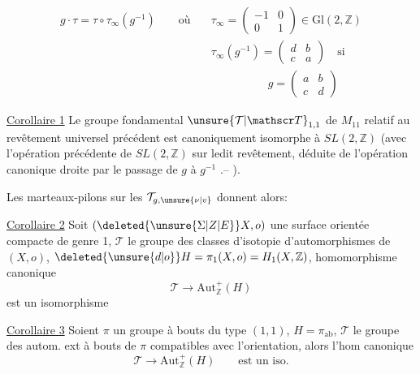 \[
\begin{aligned}
g\cdot\tau=\tau\circ\tau_\infty(g^{-1})\qquad \text{où}\quad
&\tau_\infty=\begin{pmatrix}-1&0\\0&1\end{pmatrix}\in\mathrm{Gl}(2,\mathbb Z)\\
&\tau_\infty(g^{-1})=\begin{pmatrix}d&b\\c&a\end{pmatrix}\quad \text{si}\\
&\hspace{5em}g=\begin{pmatrix}a&b\\c&d\end{pmatrix}
\end{aligned}
\]

\uline{Corollaire 1} Le groupe fondamental $\unsure{\mathcal T|\mathscr T}_{1,1}$ de $M_{11}$ relatif au revêtement universel précédent est canoniquement isomorphe à $SL(2,\mathbb Z)$ (avec l'opération précédente  de $SL(2,\mathbb Z)$ sur ledit revêtement, déduite de l'opération canonique  droite par le passage de $g$ à $g^{-1}$ .-- ).

Les marteaux-pilons sur les $\mathcal T_{g,\unsure{\nu|v}}$ donnent alors:

\uline{Corollaire 2} Soit $(\deleted{\unsure{\Sigma|Z|E}}X,o)$ une surface orientée compacte de genre 1, $\mathcal T$ le groupe des classes d'isotopie d'automorphismes de $(X,o)$, $\deleted{\unsure{d|o}}H=\pi_1(X,o)=H_1(X,\mathbb Z)$,   homomorphisme canonique
\[
\mathcal T\longrightarrow\mathrm{Aut}^{+}_{\mathbb Z}(H)\tag*{(16)}
\]
est un isomorphisme

\uline{Corollaire 3} Soient $\pi$ un groupe à bouts du type $(1,1)$, $H=\pi_{\mathrm{ab}}$, $\mathcal T$ le groupe des autom. ext à bouts de $\pi$ compatibles avec l'orientation, alors l'hom canonique
\[
\mathcal T\longrightarrow\mathrm{Aut}^{+}_{\mathbb Z}(H)\qquad\text{est un iso.}
\]
